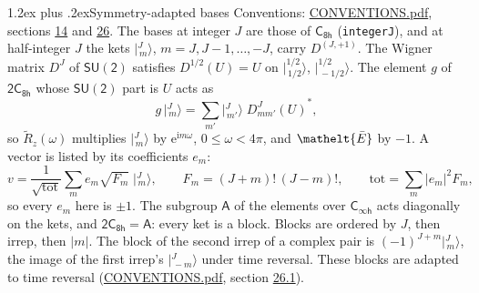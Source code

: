 \documentclass[10pt,a4paper]{article}
\makeatletter
\renewcommand\section{\@startsection{section}{1}{\z@}{-3ex plus -1ex minus -.2ex}%
  {1.2ex plus .2ex}{\normalfont\large\sffamily\bfseries\color{parttitle}}}
\numberwithin{equation}{section}
\newcommand{\eltfont}[1]{{\let\sigma\eltsigma\mathelt{#1}}}
\newcommand{\grp}[1]{\mathsf{#1}}
\newcommand{\elt}[1]{\eltfont{#1}}
\newcommand{\iunit}{\mathrm{i}}
\newcommand{\expe}{\mathrm{e}}
\newcommand{\irrJp}[2]{D^{(#1,#2)}}
\newcommand{\wignerD}[1]{D^{#1}}
\newcommand{\conj}[1]{{#1}^{*}}
\newcommand{\jm}[2]{\bigl\lvert{}^{#1}_{\,#2}\bigr\rangle}
\newcommand{\barred}[1]{\bar{#1}}
\newcommand{\lift}[1]{\tilde{#1}}
\makeatother
\begin{document}
\section{Symmetry-adapted bases}\label{s:bases}
Conventions: \href{../../CONVENTIONS.pdf}{CONVENTIONS.pdf}, sections \href{../../../rotation/CONVENTIONS.pdf\#conv.14}{14} and \href{../../CONVENTIONS.pdf\#conv.26}{26}.
\leavevmode\label{n:index.m}\label{n:vector.ket}The bases at integer $J$ are those of \href{../../../rotation/data/pdf/C8h.pdf}{$\grp{C_{8h}}$} (\texttt{integerJ}), and at half-integer $J$ the kets $\jm{J}{m}$, $m = J, J-1, \dots, -J$, carry $\irrJp{J}{+1}$. \label{n:matrix.wigner}The Wigner matrix $\wignerD{J}$ of $\grp{SU(2)}$ satisfies $\wignerD{1/2}(U) = U$ on $\jm{1/2}{1/2}$, $\jm{1/2}{-1/2}$. The element $g$ of $\grp{2C_{8h}}$ whose $\grp{SU(2)}$ part is $U$ acts as
\begin{equation}\label{e:action}g\,\jm{J}{m} = \sum_{m'} \jm{J}{m'}\; \conj{\wignerD{J}_{m m'}(U)},\end{equation}
so $\lift{R}_{z}(\omega)$ multiplies $\jm{J}{m}$ by $\expe^{\iunit m\omega}$, $0 \le \omega < 4\pi$, and $\elt{\barred{E}}$ by $-1$. \label{n:index.ketcoefficient}\label{n:vector.basis.symmetry}\label{n:index.ketweight}\label{n:index.total}A vector is listed by its coefficients $e_m$:
\begin{equation}\label{e:ket}v = \frac{1}{\sqrt{\mathrm{tot}}}\sum_m e_m\sqrt{F_m}\;\jm{J}{m},\qquad F_m = (J+m)!\,(J-m)!,\qquad \mathrm{tot} = \sum_m |e_m|^2F_m,\end{equation}
so every $e_m$ here is $\pm 1$.
\leavevmode\label{n:group.A}The subgroup $\grp{A}$ of the elements over $\grp{C_{\infty h}}$ acts diagonally on the kets, and $\grp{2C_{8h}} = \grp{A}$: every ket is a block. Blocks are ordered by $J$, then irrep, then $|m|$. The block of the second irrep of a complex pair is $(-1)^{J+m}\jm{J}{m}$, the image of the first irrep's $\jm{J}{-m}$ under time reversal. These blocks are adapted to time reversal (\href{../../CONVENTIONS.pdf}{CONVENTIONS.pdf}, section \href{../../CONVENTIONS.pdf\#conv.26.1}{26.1}).
\end{document}
